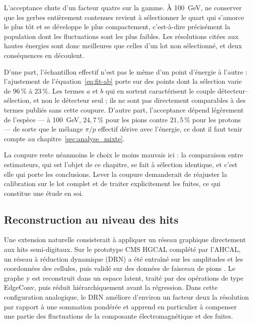 L'acceptance chute d'un facteur quatre sur la gamme. À 100~GeV, ne conserver que les gerbes entièrement contenues revient à sélectionner le quart qui s'amorce le plus tôt et se développe le plus compactement, c'est-à-dire précisément la population dont les fluctuations sont les plus faibles. Les résolutions citées aux hautes énergies sont donc meilleures que celles d'un lot non sélectionné, et deux conséquences en découlent.

D'une part, l'échantillon effectif n'est pas le même d'un point d'énergie à l'autre : l'ajustement de l'équation~\ref{eq:fit-ab} porte sur des points dont la sélection varie de $96\,\%$ à $23\,\%$. Les termes $a$ et $b$ qui en sortent caractérisent le couple détecteur--sélection, et non le détecteur seul ; ils ne sont pas directement comparables à des termes publiés sans cette coupure. D'autre part, l'acceptance dépend légèrement de l'espèce — à 100~GeV, $24{,}7\,\%$ pour les pions contre $21{,}5\,\%$ pour les protons — de sorte que le mélange $\pi/p$ effectif dérive avec l'énergie, ce dont il faut tenir compte au chapitre~\ref{sec:analyse_mixte}.

La coupure reste néanmoins le choix le moins mauvais ici : la comparaison entre estimateurs, qui est l'objet de ce chapitre, se fait à sélection identique, et c'est elle qui porte les conclusions. Lever la coupure demanderait de réajuster la calibration sur le lot complet et de traiter explicitement les fuites, ce qui constitue une étude en soi.

\subsection{Reconstruction au niveau des hits}
\label{sec:energie-niveau-hits}

Une extension naturelle consisterait à appliquer un réseau graphique directement aux hits semi-digitaux. Sur le prototype CMS HGCAL complété par l'AHCAL, un réseau à réduction dynamique (DRN) a été entraîné sur les amplitudes et les coordonnées des cellules, puis validé sur des données de faisceau de pions \cite{aamir2024hgcalgnn}. Le graphe y est reconstruit dans un espace latent, traité par des opérations de type EdgeConv, puis réduit hiérarchiquement avant la régression. Dans cette configuration analogique, le DRN améliore d'environ un facteur deux la résolution par rapport à une sommation pondérée et apprend en particulier à compenser une partie des fluctuations de la composante électromagnétique et des fuites.

